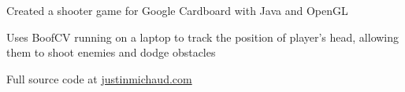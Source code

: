 \documentclass[]{deedy-resume-openfont}
\begin{document}
\begin{minipage}[t]{0.69\textwidth}
\begin{tightemize}
\item Created a shooter game for Google Cardboard with Java and OpenGL 
\item Uses BoofCV running on a laptop to track the position of player’s head, allowing them to shoot enemies and dodge obstacles
\item Full source code at \href{http://justinmichaud.com}{justinmichaud.com}
\end{tightemize}
\sectionsep

\end{minipage} 
\end{document}
